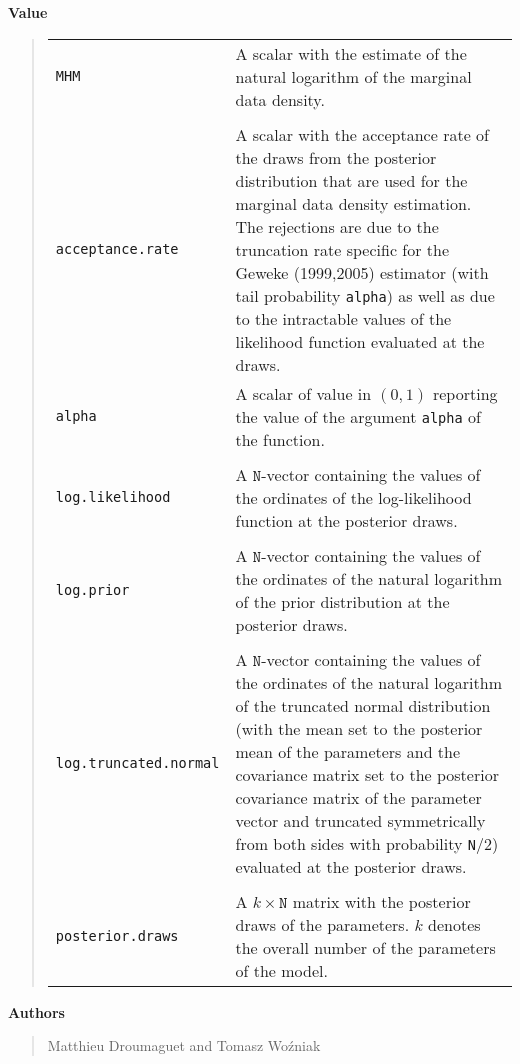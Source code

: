 \documentclass[final,3p,authoryear]{elsarticle}
\begin{document}
\newpage\noindent\textbf{Value}

\begin{quote}
\begin{tabular}{p{3cm}p{10cm}}
\texttt{MHM} & A scalar with the estimate of the natural logarithm of the marginal data density. \\
&\\
\texttt{acceptance.rate} & A scalar with the acceptance rate of the draws from the posterior distribution that are used for the marginal data density estimation. The rejections are due to the truncation rate specific for the Geweke (1999,2005) estimator (with tail probability \texttt{alpha})  as well as due to the intractable values of the likelihood function evaluated at the draws. \\
\texttt{alpha} & A scalar of value in $(0,1)$ reporting the value of the argument \texttt{alpha} of the function.\\
&\\
\texttt{log.likelihood} & A $\mathtt{N}$-vector containing the values of the ordinates of the log-likelihood function at the posterior draws. \\
&\\
\texttt{log.prior} & A $\mathtt{N}$-vector containing the values of the ordinates of the natural logarithm of the prior distribution at the posterior draws. \\
&\\
\texttt{log.truncated.normal} & A $\mathtt{N}$-vector containing the values of the ordinates of the natural logarithm of the truncated normal distribution (with the mean set to the posterior mean of the parameters and the covariance matrix set to the posterior covariance matrix of the parameter vector and truncated symmetrically from both sides with probability \texttt{N}/2) evaluated at the posterior draws.\\
&\\
\texttt{posterior.draws} & A $k\times \mathtt{N}$ matrix with the posterior draws of the parameters. $k$ denotes the overall number of the parameters of the model.
\end{tabular}
\end{quote}

\bigskip\noindent\textbf{Authors}
\begin{quote}
Matthieu Droumaguet and Tomasz Wo\'zniak
\end{quote}
\end{document}

